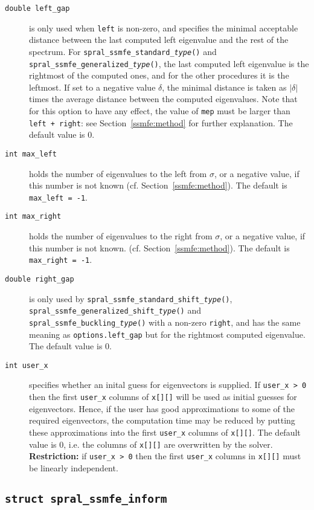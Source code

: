 \begin{description}
%
\item[\texttt{double left\_gap}]
is only used when
{\tt left} is non-zero, and
specifies the minimal acceptable distance
between the last computed left eigenvalue
and the rest of the spectrum.
For {\tt spral\_ssmfe\_standard\_\textit{type}()} and
{\tt spral\_ssmfe\_generalized\_\textit{type}()},
the last computed left eigenvalue
is the rightmost of the computed ones,
and for the other procedures
it is the leftmost.
If set to a negative value $\delta$,
the minimal distance is taken as
$|\delta|$ times the average distance between the computed eigenvalues.
Note that for this option to have any effect,
the value of {\tt mep} must be larger than
{\tt left + right}: see Section~\ref{ssmfe:method}
for further explanation.
The default value is 0.
%
\item[\texttt{int max\_left}]
holds the number of eigenvalues to the left from $\sigma$,
or a negative value, if this number is not known
(cf. Section~\ref{ssmfe:method}).
The default is {\tt max\_left = -1}.
%
\item[\texttt{int max\_right}]
holds the number of eigenvalues to the right from $\sigma$,
or a negative value, if this number is not known.
(cf. Section~\ref{ssmfe:method}).
The default is {\tt max\_right = -1}.
%
\item[\texttt{double right\_gap}]
is only used by 
{\tt spral\_ssmfe\_standard\_shift\_\textit{type}()},
{\tt spral\_ssmfe\_generalized\_shift\_\textit{type}()}
and {\tt spral\_ssmfe\_buckling\_\textit{type}()}
with a non-zero {\tt right}, and
has the same meaning as {\tt options.left\_gap}
but for the rightmost computed eigenvalue.
The default value is 0.
%
\item[\texttt{int user\_x}] specifies whether an inital guess for eigenvectors is supplied.
If {\tt user\_x > 0} then the first {\tt user\_x} columns
of {\tt x[][]} will be used as initial guesses for eigenvectors.
Hence, if the user has good approximations
to some of the required eigenvectors, the computation time
may be reduced by putting these approximations
into the first {\tt user\_x} columns of {\tt x[][]}.
The default value is 0, 
i.e. the columns of {\tt x[][]} are overwritten by the solver.
{\bf Restriction:} if {\tt user\_x > 0} then
the first {\tt user\_x} columns in {\tt x[][]}
must be linearly independent.
%
\end{description}

\subsection{\texttt{struct spral\_ssmfe\_inform}}

